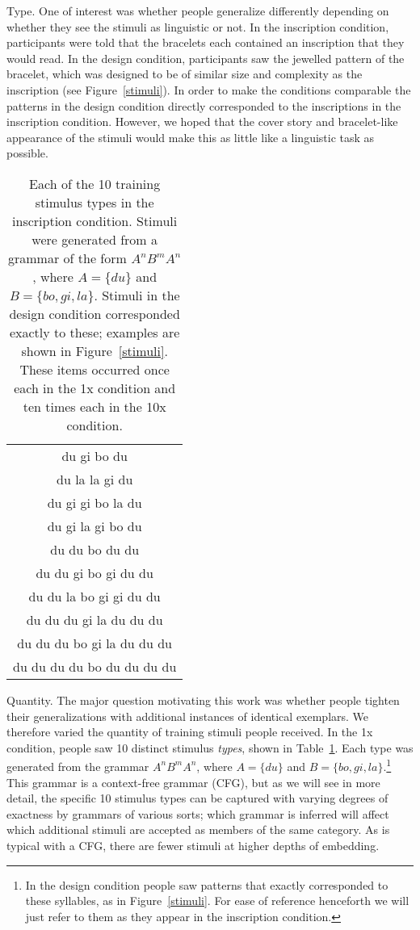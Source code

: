 \documentclass[10pt,letterpaper]{article}
\begin{document}
{\sc Type}. One of interest was whether people generalize differently depending on whether they see the stimuli as linguistic or not. In the {\sc inscription} condition, participants were told that the bracelets each contained an inscription that they would read. In the {\sc design} condition, participants saw the jewelled pattern of the bracelet, which was designed to be of similar size and complexity as the inscription (see Figure~\ref{stimuli}). In order to make the conditions comparable the patterns in the {\sc design} condition directly corresponded to the inscriptions in the {\sc inscription} condition. However, we hoped that the cover story and bracelet-like appearance of the stimuli would make this as little like a linguistic task as possible. 


\begin{table}[t]
\begin{center}
\begin{tabular}{|c|}
\hline
du gi bo du \\
du la la gi du\\
du gi gi bo la du \\
du gi la gi bo du \\
du du bo du du \\
du du gi bo gi du du \\
du du la bo gi gi du du \\
du du du gi la du du du \\
du du du bo gi la du du du \\
du du du du bo du du du du \\
\hline
\end{tabular}
\caption{Each of the 10 training stimulus types in the {\sc inscription} condition. Stimuli were generated from a grammar of the form $A^nB^mA^n$, where $A = \{du\}$ and $B=\{bo,gi,la\}$. Stimuli in the {\sc design} condition corresponded exactly to these; examples are shown in Figure~\ref{stimuli}. These items occurred once each in the {\sc 1x} condition and ten times each in the {\sc 10x} condition.}
\label{stimuluslist}
\end{center}
\end{table}


{\sc Quantity}. The major question motivating this work was whether people tighten their generalizations with additional instances of identical exemplars. We therefore varied the quantity of training stimuli people received. In the {\sc 1x} condition, people saw 10 distinct stimulus {\it types}, shown in Table~\ref{stimuluslist}. Each type was generated from the grammar $A^nB^mA^n$, where $A = \{du\}$ and $B=\{bo,gi,la\}$.\footnote{In the {\sc design} condition people saw patterns that exactly corresponded to these syllables, as in Figure~\ref{stimuli}. For ease of reference henceforth we will just refer to them as they appear in the {\sc inscription} condition.} This grammar is a context-free grammar (CFG), but as we will see in more detail, the specific 10 stimulus types can be captured with varying degrees of exactness by grammars of various sorts; which grammar is inferred will affect which additional stimuli are accepted as members of the same category. As is typical with a CFG, there are fewer stimuli at higher depths of embedding. 
\end{document}
